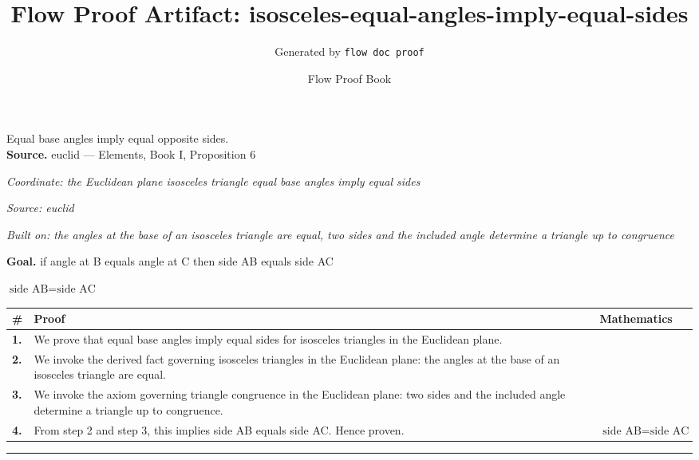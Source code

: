 \documentclass[11pt]{article}
\title{Flow Proof Artifact: isosceles-equal-angles-imply-equal-sides}
\author{Generated by \texttt{flow doc proof}}
\date{Flow Proof Book}
\theoremstyle{definition}
\begin{document}
\maketitle
Equal base angles imply equal opposite sides.\\[0.5em]
\textbf{Source.} euclid — Elements, Book I, Proposition 6\\[0.5em]
\bigskip
{}\par
\smallskip\noindent\textit{Coordinate: the Euclidean plane \cdot isosceles triangle \cdot equal base angles imply equal sides}\par
\smallskip\noindent\textit{Source: euclid}\par
\smallskip\noindent\textit{Built on: the angles at the base of an isosceles triangle are equal, two sides and the included angle determine a triangle up to congruence}\par
\medskip
\noindent\textbf{Goal.} if angle at B equals angle at C then side AB equals side AC\par
\noindent$\displaystyle \text{side AB} = \text{side AC}$\par
\medskip
\noindent
\begin{tabular}{@{} >{\raggedright\arraybackslash}p{} >{\raggedright\arraybackslash}p{} >{\raggedleft\arraybackslash}p{} @{}}
\textbf{\#} & \textbf{Proof} & \textbf{Mathematics} \\
\midrule
\textbf{1.} & We prove that equal base angles imply equal sides for isosceles triangles in the Euclidean plane. & \\[0.45em]
\textbf{2.} & We invoke the derived fact governing isosceles triangles in the Euclidean plane: the angles at the base of an isosceles triangle are equal. & \\[0.45em]
\textbf{3.} & We invoke the axiom governing triangle congruence in the Euclidean plane: two sides and the included angle determine a triangle up to congruence. & \\[0.45em]
\textbf{4.} & From step 2 and step 3, this implies side AB equals side AC. Hence proven. & $\displaystyle \text{side AB} = \text{side AC}$ \\[0.45em]
\bottomrule
\end{tabular}
\label{thm:Geometry-isosceles triangle-equal_base_angles_imply_equal_sides}
\par\medskip\hrule
\end{document}
